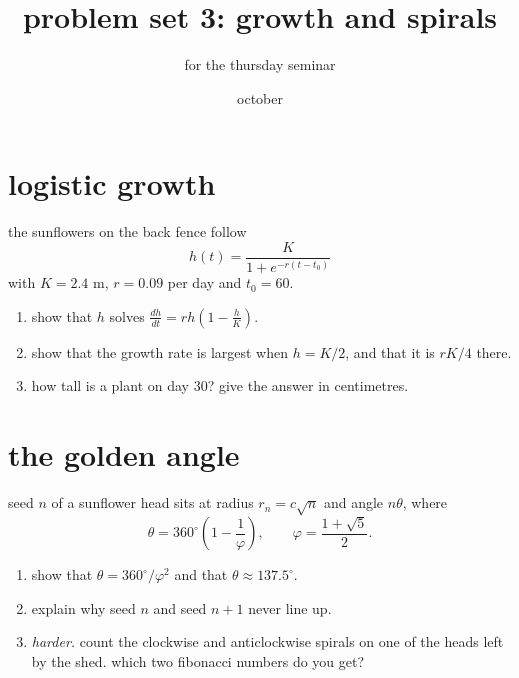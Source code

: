 \documentclass{article}
\title{problem set 3: growth and spirals}
\author{for the thursday seminar}
\date{october}
\begin{document}
\maketitle

\section{logistic growth}

the sunflowers on the back fence follow
\[
  h(t) = \frac{K}{1 + e^{-r(t - t_0)}}
\]
with $K = 2.4$ m, $r = 0.09$ per day and $t_0 = 60$.

\begin{enumerate}
  \item show that $h$ solves $\frac{dh}{dt} = r h \left(1 - \frac{h}{K}\right)$.
  \item show that the growth rate is largest when $h = K/2$, and that it is $rK/4$ there.
  \item how tall is a plant on day 30? give the answer in centimetres.
\end{enumerate}

\section{the golden angle}

seed $n$ of a sunflower head sits at radius $r_n = c\sqrt{n}$ and angle $n\theta$, where
\[
  \theta = 360^\circ \left(1 - \frac{1}{\varphi}\right), \qquad \varphi = \frac{1 + \sqrt{5}}{2}.
\]

\begin{enumerate}
  \item show that $\theta = 360^\circ / \varphi^2$ and that $\theta \approx 137.5^\circ$.
  \item explain why seed $n$ and seed $n + 1$ never line up.
  \item \emph{harder.} count the clockwise and anticlockwise spirals on one of the heads left by the shed. which two fibonacci numbers do you get?
\end{enumerate}
\end{document}
